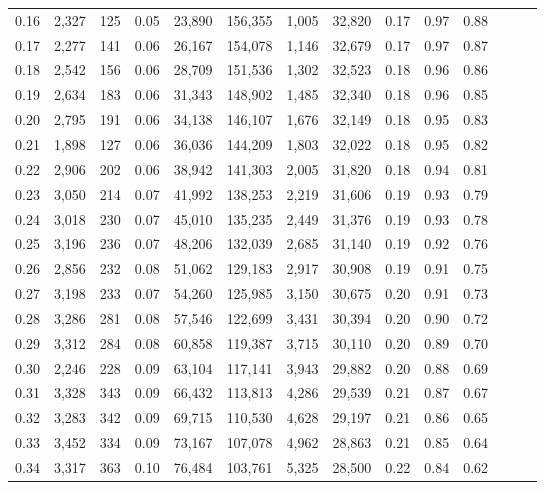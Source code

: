 \begin{tabular}{rrrrrrrrrrrrrr}
0.16 &  2,327 &  125 &  0.05 &   23,890 &  156,355 &   1,005 &  32,820 &  0.17 &  0.97 &      0.88 \\
0.17 &  2,277 &  141 &  0.06 &   26,167 &  154,078 &   1,146 &  32,679 &  0.17 &  0.97 &      0.87 \\
0.18 &  2,542 &  156 &  0.06 &   28,709 &  151,536 &   1,302 &  32,523 &  0.18 &  0.96 &      0.86 \\
0.19 &  2,634 &  183 &  0.06 &   31,343 &  148,902 &   1,485 &  32,340 &  0.18 &  0.96 &      0.85 \\
0.20 &  2,795 &  191 &  0.06 &   34,138 &  146,107 &   1,676 &  32,149 &  0.18 &  0.95 &      0.83 \\
0.21 &  1,898 &  127 &  0.06 &   36,036 &  144,209 &   1,803 &  32,022 &  0.18 &  0.95 &      0.82 \\
0.22 &  2,906 &  202 &  0.06 &   38,942 &  141,303 &   2,005 &  31,820 &  0.18 &  0.94 &      0.81 \\
0.23 &  3,050 &  214 &  0.07 &   41,992 &  138,253 &   2,219 &  31,606 &  0.19 &  0.93 &      0.79 \\
0.24 &  3,018 &  230 &  0.07 &   45,010 &  135,235 &   2,449 &  31,376 &  0.19 &  0.93 &      0.78 \\
0.25 &  3,196 &  236 &  0.07 &   48,206 &  132,039 &   2,685 &  31,140 &  0.19 &  0.92 &      0.76 \\
0.26 &  2,856 &  232 &  0.08 &   51,062 &  129,183 &   2,917 &  30,908 &  0.19 &  0.91 &      0.75 \\
0.27 &  3,198 &  233 &  0.07 &   54,260 &  125,985 &   3,150 &  30,675 &  0.20 &  0.91 &      0.73 \\
0.28 &  3,286 &  281 &  0.08 &   57,546 &  122,699 &   3,431 &  30,394 &  0.20 &  0.90 &      0.72 \\
0.29 &  3,312 &  284 &  0.08 &   60,858 &  119,387 &   3,715 &  30,110 &  0.20 &  0.89 &      0.70 \\
0.30 &  2,246 &  228 &  0.09 &   63,104 &  117,141 &   3,943 &  29,882 &  0.20 &  0.88 &      0.69 \\
0.31 &  3,328 &  343 &  0.09 &   66,432 &  113,813 &   4,286 &  29,539 &  0.21 &  0.87 &      0.67 \\
0.32 &  3,283 &  342 &  0.09 &   69,715 &  110,530 &   4,628 &  29,197 &  0.21 &  0.86 &      0.65 \\
0.33 &  3,452 &  334 &  0.09 &   73,167 &  107,078 &   4,962 &  28,863 &  0.21 &  0.85 &      0.64 \\
0.34 &  3,317 &  363 &  0.10 &   76,484 &  103,761 &   5,325 &  28,500 &  0.22 &  0.84 &      0.62 \\

\end{tabular}
